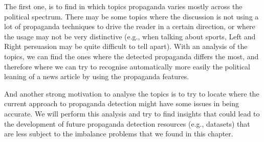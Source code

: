 The first one, is to find in which topics propaganda varies mostly across the political spectrum. There may be some topics where the discussion is not using a lot of propaganda techniques to drive the reader in a certain direction, or where the usage may not be very distinctive (e.g., when talking about sports, Left and Right persuasion may be quite difficult to tell apart).
With an analysis of the topics, we can find the ones where the detected propaganda differs the most, and therefore where we can try to recognise automatically more easily the political leaning of a news article by using the propaganda features.

And another strong motivation to analyse the topics is to try to locate where the current approach to propaganda detection might have some issues in being accurate.
We will perform this analysis and try to find insights that could lead to the development of future propaganda detection resources (e.g., datasets) that are less subject to the imbalance problems that we found in this chapter.


